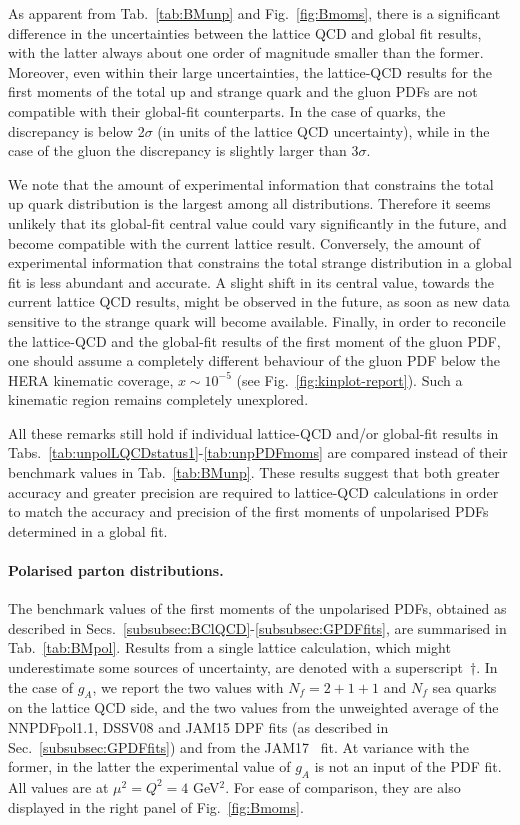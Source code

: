 As apparent from Tab.~\ref{tab:BMunp} and Fig.~\ref{fig:Bmoms}, there is a 
significant difference in the uncertainties between the lattice QCD and 
global fit results, with the latter always about one order of magnitude 
smaller than the former.
%
Moreover, even within their large uncertainties, the lattice-QCD results 
for the first moments of the total up and strange quark and the gluon PDFs
are not compatible with their global-fit counterparts.
%
In the case of quarks, the discrepancy is below 2$\sigma$ (in units of the 
lattice QCD uncertainty), while in the case of the gluon the discrepancy is
slightly larger than 3$\sigma$.

We note that the amount of experimental information that constrains the
total up quark distribution is the largest among all distributions.
%
Therefore it seems unlikely that its global-fit central value could vary 
significantly in the future, and become compatible with the current
lattice result.
%
Conversely, the amount of experimental information that constrains the
total strange distribution in a global fit is less abundant and accurate.
%
A slight shift in its central value, towards the current lattice QCD results,
might be observed in the future, as soon as new data sensitive to the strange 
quark will become available.
%
Finally, in order to reconcile the lattice-QCD and the global-fit results
of the first moment of the gluon PDF, one should assume a completely
different behaviour of the gluon PDF below the HERA kinematic
coverage, $x\sim10^{-5}$ (see Fig.~\ref{fig:kinplot-report}).
%
Such a kinematic region remains completely unexplored.

All these remarks still hold if individual lattice-QCD and/or global-fit
results in Tabs.~\ref{tab:unpolLQCDstatus1}-\ref{tab:unpPDFmoms} are 
compared instead of their benchmark values in Tab.~\ref{tab:BMunp}. 
%
These results suggest that both greater accuracy and greater precision are
required to lattice-QCD calculations in order to match the accuracy and 
precision of the first moments of unpolarised PDFs determined in a global
fit.

\paragraph{Polarised parton distributions.}
%
%
The benchmark values of the first moments of the unpolarised PDFs, obtained
as described in Secs.~\ref{subsubsec:BClQCD}-\ref{subsubsec:GPDFfits}, 
are summarised in Tab.~\ref{tab:BMpol}.
%
Results from a single lattice calculation, which might underestimate some 
sources of uncertainty, are denoted with a superscript~$\dagger$.
%
In the case of $g_A$, we report the two values with $N_f=2+1+1$ and
$N_f$ sea quarks on the lattice QCD side, and the two values from the 
unweighted average of the NNPDFpol1.1, DSSV08 and JAM15 DPF fits
(as described in Sec.~\ref{subsubsec:GPDFfits}) and from the 
JAM17~\cite{Ethier:2017zbq} fit.
%
At variance with the former, in the latter the experimental value of $g_A$
is not an input of the PDF fit.
%
All values are at $\mu^2=Q^2=4$ GeV$^2$.
%
For ease of comparison, they are also displayed in 
the right panel of Fig.~\ref{fig:Bmoms}.

